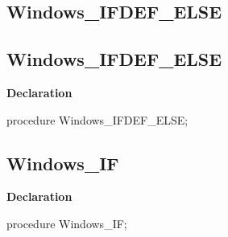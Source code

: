 \documentclass{report}
\newif\ifpdf
\begin{document}
\subsection*{\large{\textbf{Windows{\_}IFDEF{\_}ELSE}}\normalsize\hspace{1ex}\hrulefill}
\else
\subsection*{Windows{\_}IFDEF{\_}ELSE}
\fi
\label{ok_if_expressions-Windows_IFDEF_ELSE}
\begin{list}{}{
\setlength{\itemindent}{0cm}
\setlength{\listparindent}{0cm}
\setlength{\leftmargin}{\evensidemargin}
\addtolength{\leftmargin}{\tmplength}
\settowidth{\labelsep}{X}
\addtolength{\leftmargin}{\labelsep}
\setlength{\labelwidth}{\tmplength}
}
\item[\textbf{Declaration}\hfill]
\ifpdf
\begin{flushleft}
\fi
\begin{ttfamily}
procedure Windows{\_}IFDEF{\_}ELSE;\end{ttfamily}

\ifpdf
\end{flushleft}
\fi

\end{list}
\ifpdf
\subsection*{\large{\textbf{Windows{\_}IF}}\normalsize\hspace{1ex}\hrulefill}
\else
\subsection*{Windows{\_}IF}
\fi
\label{ok_if_expressions-Windows_IF}
\begin{list}{}{
\setlength{\itemindent}{0cm}
\setlength{\listparindent}{0cm}
\setlength{\leftmargin}{\evensidemargin}
\addtolength{\leftmargin}{\tmplength}
\settowidth{\labelsep}{X}
\addtolength{\leftmargin}{\labelsep}
\setlength{\labelwidth}{\tmplength}
}
\item[\textbf{Declaration}\hfill]
\ifpdf
\begin{flushleft}
\fi
\begin{ttfamily}
procedure Windows{\_}IF;\end{ttfamily}

\ifpdf
\end{flushleft}
\fi

\end{list}
\ifpdf
\end{document}
